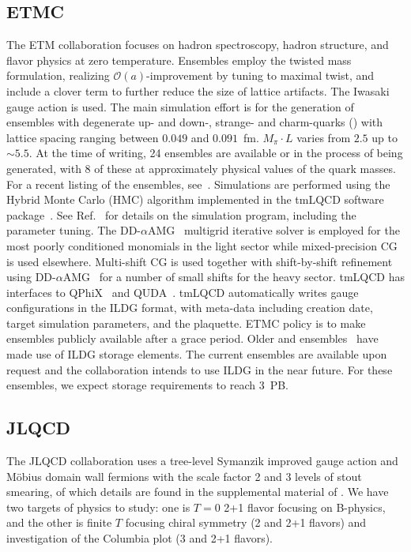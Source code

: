 \documentclass[a4paper,11pt]{article}
\begin{document}
\subsection{ETMC}
The ETM collaboration focuses on hadron spectroscopy, hadron
structure, and flavor physics at zero temperature. Ensembles employ
the twisted mass formulation, realizing $\mathcal{O}(a)$-improvement
by tuning to maximal twist, and include a clover term to further
reduce the size of lattice artifacts. The Iwasaki gauge action is
used. The main simulation effort is for the generation of ensembles
with degenerate up- and down-, strange- and charm-quarks
() with lattice spacing ranging between $0.049$ and
$0.091$~fm. $M_\pi\cdot L$ varies from $2.5$ up to ${\sim}5.5$. At the
time of writing, 24 ensembles are available or in the process of being
generated, with 8 of these at approximately physical values of the
quark masses. For a recent listing of the ensembles,
see~\cite{ETMCPoster:2024}. Simulations are performed using the Hybrid
Monte Carlo (HMC) algorithm implemented in the tmLQCD software
package~\cite{Jansen:2009xp,Deuzeman:2013xaa,Abdel-Rehim:2013wba}. See
Ref.~\cite{Alexandrou:2018egz} for details on the simulation program,
including the parameter tuning. The
DD-$\alpha$AMG~\cite{Frommer:2013fsa,Alexandrou:2016izb} multigrid
iterative solver is employed for the most poorly conditioned monomials
in the light sector while mixed-precision CG is used
elsewhere. Multi-shift CG is used together with shift-by-shift
refinement using DD-$\alpha$AMG~\cite{Alexandrou:2018wiv} for a number
of small shifts for the heavy sector. tmLQCD has interfaces to
QPhiX~\cite{Joo:2013lwm} and QUDA~\cite{Clark:2009wm,Babich:2011np}.
tmLQCD automatically writes gauge configurations in the ILDG format,
with meta-data including creation date, target simulation parameters,
and the plaquette. ETMC policy is to make ensembles publicly
available after a grace period. Older  and 
ensembles~\cite{Baron:2010bv,EuropeanTwistedMass:2010voq,ETM:2009ztk}
have made use of ILDG storage elements. The current ensembles are
available upon request and the collaboration intends to use ILDG in
the near future. For these ensembles, we expect storage requirements
to reach 3~PB.

\subsection{JLQCD}
The JLQCD collaboration uses a tree-level Symanzik improved gauge
action and M\"obius domain wall fermions with the scale factor 2 and 3
levels of stout smearing, of which details are found in the
supplemental material of \cite{Colquhoun:2022atw}.  We have two
targets of physics to study: one is $T=0$ 2+1 flavor focusing on
B-physics, and the other is finite $T$ focusing chiral symmetry (2 and
2+1 flavors) and investigation of the Columbia plot (3 and 2+1
flavors).
\end{document}
